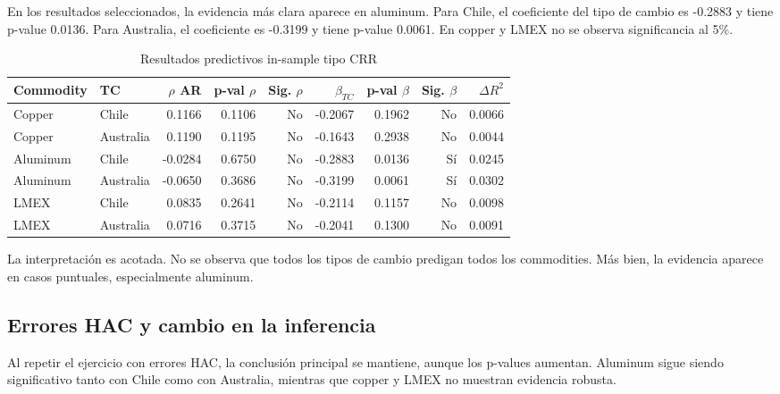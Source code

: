 \documentclass[11pt,a4paper]{article}
\begin{document}
En los resultados seleccionados, la evidencia más clara aparece en aluminum. Para Chile, el coeficiente del tipo de cambio es -0.2883 y tiene p-value 0.0136. Para Australia, el coeficiente es -0.3199 y tiene p-value 0.0061. En copper y LMEX no se observa significancia al 5\%.

\begin{table}[H]
\centering
\caption{Resultados predictivos in-sample tipo CRR}
\scriptsize
\begin{tabular}{llrrrrrrr}
\toprule
Commodity & TC & $\rho$ AR & p-val $\rho$ & Sig. $\rho$ & $\beta_{TC}$ & p-val $\beta$ & Sig. $\beta$ & $\Delta R^2$ \\
\midrule
Copper & Chile & 0.1166 & 0.1106 & No & -0.2067 & 0.1962 & No & 0.0066 \\
Copper & Australia & 0.1190 & 0.1195 & No & -0.1643 & 0.2938 & No & 0.0044 \\
Aluminum & Chile & -0.0284 & 0.6750 & No & -0.2883 & 0.0136 & Sí & 0.0245 \\
Aluminum & Australia & -0.0650 & 0.3686 & No & -0.3199 & 0.0061 & Sí & 0.0302 \\
LMEX & Chile & 0.0835 & 0.2641 & No & -0.2114 & 0.1157 & No & 0.0098 \\
LMEX & Australia & 0.0716 & 0.3715 & No & -0.2041 & 0.1300 & No & 0.0091 \\
\bottomrule
\end{tabular}
\end{table}

La interpretación es acotada. No se observa que todos los tipos de cambio predigan todos los commodities. Más bien, la evidencia aparece en casos puntuales, especialmente aluminum.

\subsection{Errores HAC y cambio en la inferencia}

Al repetir el ejercicio con errores HAC, la conclusión principal se mantiene, aunque los p-values aumentan. Aluminum sigue siendo significativo tanto con Chile como con Australia, mientras que copper y LMEX no muestran evidencia robusta.
\end{document}
